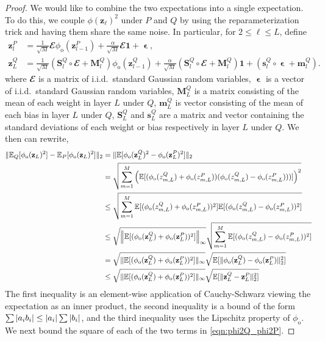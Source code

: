 \documentclass[twoside]{article}
\renewcommand{\ss}[1]{_{\text{#1}}}
\newcommand{\vm}{\mathbf{m}}
\newcommand{\vs}{\mathbf{s}}
\newcommand{\vz}{\mathbf{z}}
\newcommand{\vep}{\bm{\upvarepsilon}}
\newcommand{\vone}{\mathbf{1}}
\newcommand{\mM}{\mathbf{M}}
\newcommand{\mS}{\mathbf{S}}
\newcommand{\E}{\mathbb{E}}
\renewcommand{\P}{\mathbb{P}}
\newcommand{\Q}{\mathbb{Q}}
\renewcommand{\Q}{\ensuremath{Q}}
\renewcommand{\P}{\ensuremath{P}}
\newcommand{\opspace}{}
\let\sup\relax\DeclareMathOperator*{\sup}{sup\opspace}
\renewcommand{\ss}[1]{_{\text{#1}}}        %
\DeclarePairedDelimiter\norm{\|}{\|}             %
\theoremstyle{theoremstyle}
\begin{document}
\begin{proof}
We would like to combine the two expectations into a single expectation. To do this, we couple $\phi(\vz_{\ell})^2$ under $\P$ and $\Q$ by using the reparameterization trick and having them share the same noise. In particular, for $2 \leq \ell \le L$,  define
\begin{align}
     \vz^P_l&= \tfrac1{\sqrt{M}}\mathbfcal{E} \phi\ss{o}(\vz^P_{l-1}) + \tfrac{\alpha}{\sqrt{M}}\mathbfcal{E}\vone + \vep, \\
    \vz^Q_L
    &= \tfrac1{\sqrt{M}}(\mS^Q_l \circ \mathbfcal{E} + \mM^Q_l) \phi\ss{o}(\vz^Q_{l-1}) + \tfrac{\alpha}{\sqrt{M}}(\mS^Q_l \circ \mathbfcal{E} + \mM^Q_l)\vone + (\vs^Q_l \circ \vep + \vm^Q_l).
\end{align}
where $\mathbfcal{E}$ is a matrix of i.i.d.~standard Gaussian random variables, $\vep$ is a vector of i.i.d.~standard Gaussian random variables, $\mM^Q_L$ is a matrix consisting of the mean of each weight in layer $L$ under $\Q$, $\vm^Q_L$ is vector consisting of the mean of each bias in layer $L$ under $\Q$, $\mS^Q_L$ and $\vs^Q_L$ are a matrix and vector containing the standard deviations of each weight or bias respectively in layer $L$ under $\Q$. We then can rewrite,
\begin{align}
    \|\E_{\Q}[\phi\ss{o}(\vz_{L})^2 ]- \E_{\P}[\phi\ss{o}(\vz_{L})^2]\|_2 &= \norm{\E[\phi\ss{o}(\vz^Q_L)^2 - \phi\ss{o}(\vz^P_L)^2]}_2 
    \\
    & = \sqrt{\sum_{m=1}^M \left(\E[(\phi\ss{o}(z^Q_{m,L}) + \phi\ss{o}(z^P_{m, L})) (\phi\ss{o}(z^Q_{m, L}) - \phi\ss{o}(z^P_{m,L})))]\right)^2 } 
    \\
    & \leq \sqrt{\sum_{m=1}^M\E[(\phi\ss{o}(z^Q_{m,L}) + \phi\ss{o}(z^P_{m, L}))^2]\E[(\phi\ss{o}(z^Q_{m,L}) - \phi\ss{o}(z^P_{m, L}))^2]}
    \\
    & \leq \sqrt{\norm*{\E[(\phi\ss{o}(\vz^Q_L) + \phi\ss{o}(\vz^P_L))^2]}_\infty} \sqrt{\sum_{m=1}^M \E[(\phi\ss{o}(z^Q_{m,L}) - \phi\ss{o}(z^P_{m, L}))^2]}
    \\
    & = \sqrt{\norm{\E[(\phi\ss{o}(\vz^Q_L) + \phi\ss{o}(\vz^P_L))^2]}_\infty} \sqrt{ \E[ \norm{\phi\ss{o}(\vz^Q_L) - \phi\ss{o}(\vz^P_L)}^2_2] }
    \\
    &\le \sqrt{\norm{\E[(\phi\ss{o}(\vz^Q_L) + \phi\ss{o}(\vz^P_L))^2]}_\infty} \sqrt{ \E[ \norm{\vz^Q_L - \vz^P_L}^2_2] }
    \label{eqn:phi2Q_phi2P}
\end{align}
The first inequality is an element-wise application of Cauchy-Schwarz viewing the expectation as an inner product, the second inequality is a bound of the form $\sum |a_i b_i| \leq \sup |a_i| \sum |b_i|$, and the third inequality uses the Lipschitz property of $\phi\ss{o}$. We next bound the square of each of the two terms in \cref{eqn:phi2Q_phi2P}.


\end{proof}
\end{document}

